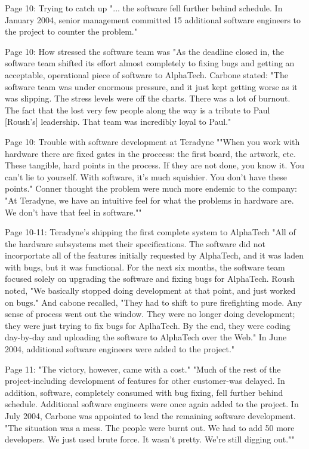 Page 10:
Trying to catch up
"... the software fell further behind schedule. In January 2004, senior management committed 15 additional software engineers to the project to counter the problem."

Page 10:
How stressed the software team was
"As the deadline closed in, the software team shifted its effort almost completely to fixing bugs and getting an acceptable, operational piece of software to AlphaTech. Carbone stated: "The software team was under enormous pressure, and it just kept getting worse as it was slipping. The stress levels were off the charts. There was a lot of burnout. The fact that the lost very few people along the way is a tribute to Paul [Roush's] leadership. That team was incredibly loyal to Paul."

Page 10:
Trouble with software development at Teradyne
""When you work with hardware there are fixed gates in the proccess: the first board, the artwork, etc. These tangible, hard points in the process. If they are not done, you know it. You can't lie to yourself. With software, it's much squishier. You don't have these points." Conner thought the problem were much more endemic to the company: "At Teradyne, we have an intuitive feel for what the problems in hardware are. We don't have that feel in software.""

Page 10-11:
Teradyne's shipping the first complete system to AlphaTech
"All of the hardware subsystems met their specifications. The software did not incorportate all of the features initially requested by AlphaTech, and it was laden with bugs, but it was functional. For the next six months, the software team focused solely on upgrading the software and fixing bugs for AlphaTech. Roush noted, "We basically stopped doing development at that point, and just worked on bugs." And cabone recalled, "They had to shift to pure firefighting mode. Any sense of process went out the window. They were no longer doing development; they were just trying to fix bugs for AplhaTech. By the end, they were coding day-by-day and uploading the software to AlphaTech over the Web." In June 2004, additional software engineers were added to the project."

Page 11:
"The victory, however, came with a cost."
"Much of the rest of the project-including development of features for other customer-was delayed. In addition, software, completely consumed with bug fixing, fell further behind schedule. Additional software engineers were once again added to the project. In July 2004, Carbone was appointed to lead the remaining software development. "The situation was a mess. The people were burnt out. We had to add 50 more developers. We just used brute force. It wasn't pretty. We're still digging out.""

